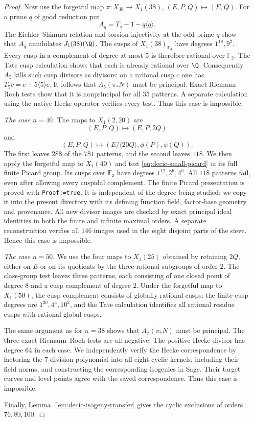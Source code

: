 \begin{proof}
Now use the forgetful map $\pi:X_{38}\to X_1(38)$, $(E,P,Q)\mapsto(E,Q)$.
For a prime $q$ of good reduction put
\[
 A_q=T_q-1-q\langle q\rangle.
\]
The Eichler--Shimura relation and torsion injectivity at the odd prime
$q$ show that $A_q$ annihilates $J_1(38)(\Q)$. The cusps of
$X_1(38)_{\mathbb F_3}$ have degrees $1^{18},9^2$. Every cusp in a
complement of degree at most $5$ is therefore rational over
$\mathbb F_3$. The Tate cusp calculation shows that each is already
rational over $\Q$. Consequently $A_5$ kills such cusp divisors as
divisors: on a rational cusp $c$ one has
$T_5c=c+5\langle5\rangle c$.
It follows that $A_5(\pi_*N)$ must be principal. Exact Riemann--Roch
tests show that it is nonprincipal for all $35$ patterns. A separate
calculation using the native Hecke operator verifies every test.
Thus this case is impossible.

\medskip\noindent
\emph{The case $n=40$.}
The maps to $X_1(2,20)$ are
\[
 (E,P,Q)\longmapsto(E,P,2Q)
\]
and
\[
 (E,P,Q)\longmapsto
 (E/\langle20Q\rangle,\phi(P),\phi(Q)).
\]
The first leaves $288$ of the $781$ patterns, and the second leaves
$118$. We then apply the forgetful map to $X_1(40)$ and test
\eqref{eq:decic-small-picard} in its full finite Picard group.
Its cusps over $\mathbb F_3$ have degrees $1^{12},2^6,4^6$.
All $118$ patterns fail, even after allowing every cuspidal complement.
The finite Picard presentation is proved with \texttt{Proof:=true}.
It is independent of the degree being studied; we copy it into the
present directory with its defining function field, factor-base
geometry and provenance. All new divisor images are checked by exact
principal ideal identities in both the finite and infinite maximal
orders. A separate reconstruction verifies all $146$ images used in
the eight disjoint parts of the sieve. Hence this case is impossible.

\medskip\noindent
\emph{The case $n=50$.}
We use the four maps to $X_1(25)$ obtained by retaining $2Q$, either
on $E$ or on its quotients by the three rational subgroups of order $2$.
The class-group test leaves three patterns, each consisting of one
closed point of degree $8$ and a cusp complement of degree $2$.
Under the forgetful map to $X_1(50)$, the cusp complement consists
of globally rational cusps: the finite cusp degrees are
$1^{20},4^4,10^2$, and the Tate calculation identifies all rational
residue cusps with rational global cusps.

The same argument as for $n=38$ shows that
$A_7(\pi_*N)$ must be principal. The three exact Riemann--Roch tests
are all negative. The positive Hecke divisor has degree $64$ in
each case. We independently verify the Hecke correspondence by
factoring the $7$-division polynomial into all eight cyclic kernels,
including their field norms, and constructing the corresponding
isogenies in Sage. Their target curves and level points agree with
the saved correspondence. Thus this case is impossible.

Finally, Lemma~\ref{lem:decic-isogeny-transfer} gives the cyclic
exclusions of orders $76,80,100$.
\end{proof}

